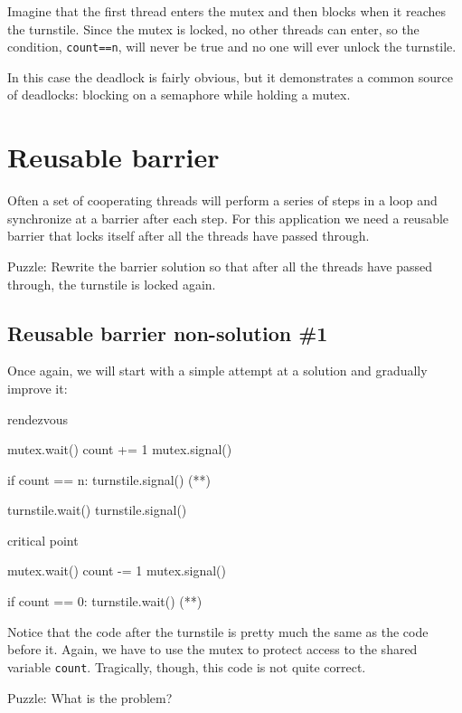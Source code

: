 \documentclass{book}
\begin{document}
Imagine that the first thread enters the
mutex and then blocks when it reaches the turnstile.
Since the mutex is locked, no other threads can enter,
so the condition, {\tt count==n}, will never be true and
no one will ever unlock the turnstile.

In this case the deadlock is fairly obvious, but it
demonstrates a
common source of deadlocks: blocking on a semaphore while
holding a mutex.


\section {Reusable barrier}
\label{rebar}

Often a set of cooperating threads will perform a series of steps
in a loop and synchronize at a barrier after each step.  For this
application we need a reusable barrier that locks itself after
all the threads have passed through.

Puzzle: Rewrite the barrier solution so that after all the threads
have passed through, the turnstile is locked again.



\subsection {Reusable barrier non-solution \#1}

Once again, we will start with a simple attempt at a solution
and gradually improve it:

\begin{unbreakable}[title={Reusable barrier non-solution}]{}
rendezvous

mutex.wait()
    count += 1
mutex.signal()

if count == n: turnstile.signal()       (*\label{problem}*)

turnstile.wait()
turnstile.signal()

critical point

mutex.wait()
    count -= 1
mutex.signal()

if count == 0: turnstile.wait()         (*\label{problem2}*)
\end{unbreakable}

Notice that the code after the turnstile is pretty much the same as
the code before it.  Again, we have to use the mutex to protect access
to the shared variable {\tt count}.
Tragically, though, this code is not quite correct.

Puzzle: What is the problem?
\end{document}
